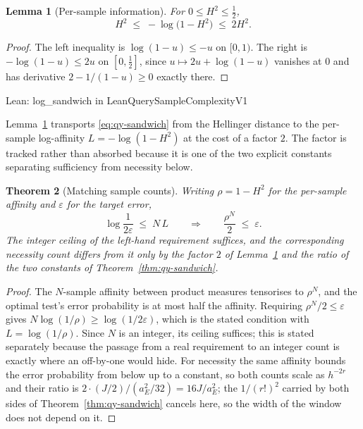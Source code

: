 \documentclass[conference]{IEEEtran}
\newtheorem{theorem}{Theorem}
\newtheorem{lemma}[theorem]{Lemma}
\theoremstyle{definition}
\newcommand{\lean}[1]{\textsf{\footnotesize #1}}
\newcommand{\leanbox}[1]{%
  \par\vspace{2pt}\noindent
  {\footnotesize\textsf{Lean: #1}}\par\vspace{2pt}}
\begin{document}
\begin{lemma}[Per-sample information]
\label{lem:qy-logsandwich}
For $0\le H^{2}\le\tfrac12$,
\begin{equation}
H^{2}\;\leq\;-\log\bigl(1-H^{2}\bigr)\;\leq\;2H^{2}.
\label{eq:qy-logsandwich}
\end{equation}
\end{lemma}

\begin{proof}
The left inequality is $\log(1-u)\le-u$ on $[0,1)$. The right is $-\log(1-u)\le2u$ on
$[0,\tfrac12]$, since $u\mapsto2u+\log(1-u)$ vanishes at $0$ and has derivative
$2-1/(1-u)\ge0$ exactly there.
\end{proof}

\leanbox{\lean{log\_sandwich} in \lean{LeanQuerySampleComplexityV1}}

Lemma~\ref{lem:qy-logsandwich} transports \eqref{eq:qy-sandwich} from the Hellinger distance to the
per-sample log-affinity $L=-\log(1-H^{2})$ at the cost of a factor $2$. The factor is
tracked rather than absorbed because it is one of the two explicit constants separating
sufficiency from necessity below.

\begin{theorem}[Matching sample counts]
\label{thm:qy-samples}
Writing $\rho=1-H^{2}$ for the per-sample affinity and $\varepsilon$ for the target error,
\begin{equation}
\log\frac{1}{2\varepsilon}\;\leq\;N\,L
\qquad\Longrightarrow\qquad
\frac{\rho^{N}}{2}\;\leq\;\varepsilon .
\label{eq:qy-samples}
\end{equation}
The integer ceiling of the left-hand requirement suffices, and the corresponding necessity
count differs from it only by the factor $2$ of Lemma~\ref{lem:qy-logsandwich} and the ratio of
the two constants of Theorem~\ref{thm:qy-sandwich}.
\end{theorem}

\begin{proof}
The $N$-sample affinity between product measures tensorises to $\rho^{N}$, and the optimal
test's error probability is at most half the affinity. Requiring $\rho^{N}/2\le\varepsilon$
gives $N\log(1/\rho)\ge\log(1/2\varepsilon)$, which is the stated condition with
$L=\log(1/\rho)$. Since $N$ is an integer, its ceiling suffices; this is stated separately
because the passage from a real requirement to an integer count is exactly where an
off-by-one would hide. For necessity the same affinity bounds the error probability from
below up to a constant, so both counts scale as $h^{-2r}$ and their ratio is
$2\cdot(J/2)/(a_{E}^{2}/32)=16J/a_{E}^{2}$; the $1/(r!)^{2}$ carried by both sides of
Theorem~\ref{thm:qy-sandwich} cancels here, so the width of the window does not depend on it.
\end{proof}
\end{document}
